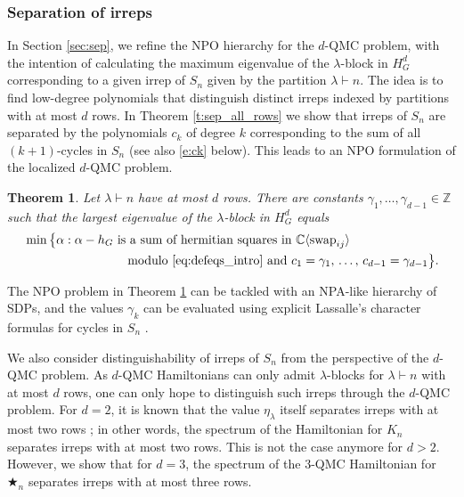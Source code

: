 \documentclass[12pt,dvipsnames,accepted=2016-08-18,a4paper,onecolumn]{quantumarticle}
\def\starn{{\bigstar_{n}}}
\numberwithin{equation}{section}
\newcommand{\ZZ}{\mathbb Z}
\newcommand{\CC}{\mathbb C}
\newtheorem{theorem}{Theorem}[section]
\theoremstyle{definition}
\begin{document}
\subsubsection{Separation of irreps} 

In Section \ref{sec:sep}, we refine the NPO hierarchy for the $d$-QMC problem, with the intention of calculating the maximum eigenvalue of the $\lambda$-block in $H_G^d$ corresponding to a given irrep of $S_n$ given by the partition $\lambda\vdash n$. The idea is to find low-degree polynomials that distinguish distinct irreps indexed by partitions with at most $d$ rows. 
In Theorem \ref{t:sep_all_rows} we show that irreps of $S_n$ are separated by the polynomials $c_k$ of degree $k$ {corresponding to the sum of all $(k+1)$-cycles in $S_n$ (see also \eqref{e:ck} below)}. This leads to an NPO formulation of the localized $d$-QMC problem.

\begin{theorem}\label{t:localized}
Let $\lambda\vdash n$ have at most $d$ rows.
There are constants $\gamma_1,\dots,\gamma_{d-1}\in\ZZ$ such that
the largest eigenvalue of the $\lambda$-block in $H_G^d$ equals
\begin{align*}
&\min\big\{
\alpha:\alpha-h_G\text{ is a sum of hermitian squares in } \CC\langle {\rm swap}_{ij}\rangle \\
&\qquad\qquad\qquad\qquad\text{ modulo \eqref{eq:defeqs_intro} and }c_1=\gamma_1,\, \dots,\, c_{d-1}=\gamma_{d-1}
\big\} .
\end{align*}
\end{theorem}

The NPO problem in Theorem \ref{t:localized}  can be tackled with an NPA-like hierarchy of SDPs, and the values $\gamma_k$ can be evaluated using explicit Lassalle's character formulas for cycles in $S_n$ \cite{Lassalle}.

We also consider distinguishability of irreps of $S_n$ from the perspective of the $d$-QMC problem. As $d$-QMC Hamiltonians can only admit $\lambda$-blocks for $\lambda\vdash n$ with at most $d$ rows, one can only hope to distinguish such irreps through the $d$-QMC problem.
For $d=2$, it is known that the value $\eta_\lambda$ itself separates irreps with at most two rows \cite{BCEHK24}; in other words, the spectrum of the Hamiltonian for $K_n$ separates irreps with at most two rows.
This is not the case anymore for $d>2$.
However, we show that for $d=3$, the spectrum of the $3$-QMC Hamiltonian for $\starn$ separates irreps with at most three rows.
\end{document}
